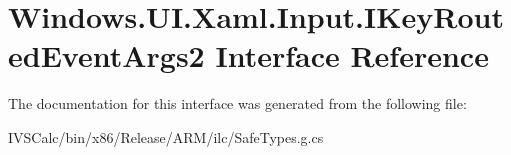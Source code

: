 \hypertarget{interface_windows_1_1_u_i_1_1_xaml_1_1_input_1_1_i_key_routed_event_args2}{}\section{Windows.\+U\+I.\+Xaml.\+Input.\+I\+Key\+Routed\+Event\+Args2 Interface Reference}
\label{interface_windows_1_1_u_i_1_1_xaml_1_1_input_1_1_i_key_routed_event_args2}


The documentation for this interface was generated from the following file\+:\begin{DoxyCompactItemize}
\item 
I\+V\+S\+Calc/bin/x86/\+Release/\+A\+R\+M/ilc/Safe\+Types.\+g.\+cs\end{DoxyCompactItemize}
